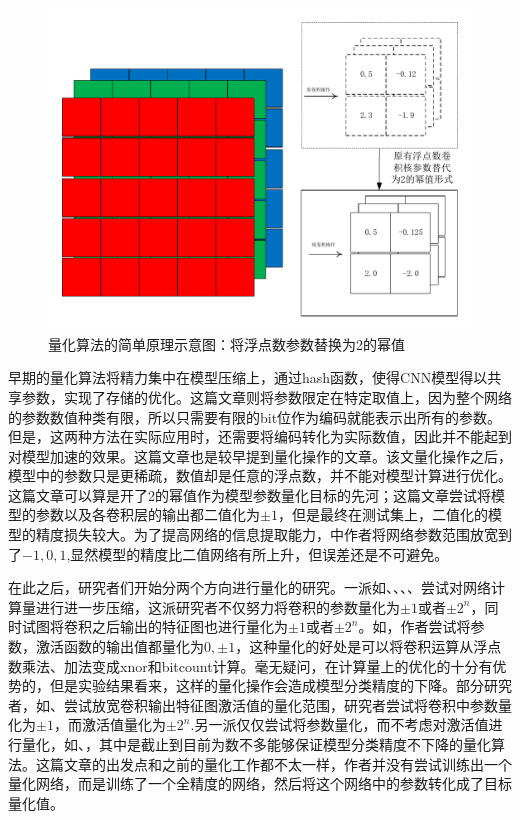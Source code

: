 \documentclass[ pdftex, oneside, master]{NJUthesis}
\begin{document}
\begin{figure}[h]
	\centering
	\includegraphics[width=0.7\linewidth]{quantization.pdf}  %
	\caption{量化算法的简单原理示意图：将浮点数参数替换为2的幂值}  %
	\label{quantization}   %
\end{figure}

早期的量化算法将精力集中在模型压缩上，\cite{earlycompression1}通过hash函数，使得CNN模型得以共享参数，实现了存储的优化。\cite{earlycompression2}这篇文章则将参数限定在特定取值上，因为整个网络的参数数值种类有限，所以只需要有限的bit位作为编码就能表示出所有的参数。但是\cite{earlycompression1}，\cite{earlycompression2}这两种方法在实际应用时，还需要将编码转化为实际数值，因此并不能起到对模型加速的效果。\cite{deepcompression}这篇文章也是较早提到量化操作的文章。该文量化操作之后，模型中的参数只是更稀疏，数值却是任意的浮点数，并不能对模型计算进行优化。\cite{binary1}这篇文章可以算是开了2的幂值作为模型参数量化目标的先河；这篇文章尝试将模型的参数以及各卷积层的输出都二值化为$\pm1$，但是最终在测试集上，二值化的模型的精度损失较大。为了提高网络的信息提取能力，\cite{ternary}中作者将网络参数范围放宽到了${-1,0,1}$,显然模型的精度比二值网络有所上升，但误差还是不可避免。

在此之后，研究者们开始分两个方向进行量化的研究。一派如\cite{binary}、\cite{xnornet}、\cite{qnn}、\cite{hwgqnet}、\cite{dorefanet:}尝试对网络计算量进行进一步压缩，这派研究者不仅努力将卷积的参数量化为$\pm1$或者$\pm2^n$，同时试图将卷积之后输出的特征图也进行量化为$\pm1$或者$\pm2^n$。如\cite{xnornet}，作者尝试将参数，激活函数的输出值都量化为${0, \pm1}$，这种量化的好处是可以将卷积运算从浮点数乘法、加法变成xnor和bitcount计算。毫无疑问，\cite{xnornet}在计算量上的优化的十分有优势的，但是实验结果看来，这样的量化操作会造成模型分类精度的下降。部分研究者，如\cite{dorefanet:}、\cite{qnn}尝试放宽卷积输出特征图激活值的量化范围，研究者尝试将卷积中参数量化为$\pm1$，而激活值量化为$\pm2^n$.另一派仅仅尝试将参数量化，而不考虑对激活值进行量化，如\cite{ternary2}、\cite{incremental}，其中\cite{incremental}是截止到目前为数不多能够保证模型分类精度不下降的量化算法。这篇文章的出发点和之前的量化工作都不太一样，作者并没有尝试训练出一个量化网络，而是训练了一个全精度的网络，然后将这个网络中的参数转化成了目标量化值。
\end{document}
